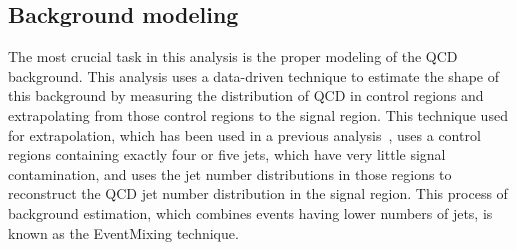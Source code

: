 



\subsection{Background modeling}
\label{sec:bkg}
\noindent

The most crucial task in this analysis is the proper modeling of the QCD background.
This analysis uses a data-driven technique to estimate the shape of this background by measuring the distribution of QCD in control regions
and extrapolating from those control regions to the signal region.
This technique used for extrapolation, which has been used in a previous analysis~\cite{PhysRevD.82.032002},
uses a control regions containing exactly four or five jets, which have very little signal contamination,
and uses the jet number distributions in those regions to reconstruct the QCD jet number distribution
in the signal region.
This process of background estimation, which combines events having lower numbers of jets, is known as the EventMixing technique.

